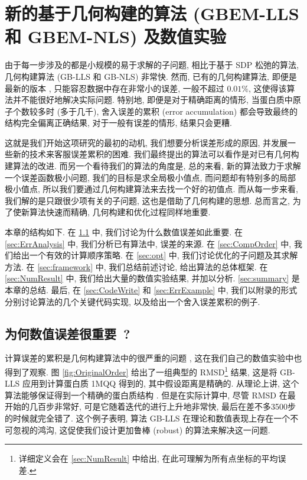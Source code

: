 \chapter{新的基于几何构建的算法 (GBEM-LLS 和 GBEM-NLS) 及数值实验}
\label{cha:ouralg}

由于每一步涉及的都是小规模的易于求解的子问题, 相比于基于 SDP 松弛的算法, 
几何构建算法 (GB-LLS 和 GB-NLS) 非常快. 
然而, 已有的几何构建算法, 即便是最新的版本 \cite{Sit2009},
只能容忍数据中存在非常小的误差, 一般不超过 $0.01\%$, 
这使得该算法并不能很好地解决实际问题.
特别地, 即便是对于精确距离的情形, 当蛋白质中原子个数较多时 (多于几千),
舍入误差的累积 (error accumulation) 都会导致最终的结构完全偏离正确结果,
对于一般有误差的情形, 结果只会更糟.

这就是我们开始这项研究的最初的动机, 我们想要分析误差形成的原因,
并发展一些新的技术来客服误差累积的困难.
我们最终提出的算法可以看作是对已有几何构建算法的改进.
而另一个看待我们的算法的角度是, 
总的来看, 新的算法致力于求解一个误差函数极小问题, 我们的目标是求全局极小值点,
而问题却有特别多的局部极小值点, 所以我们要通过几何构建算法来去找一个好的初值点.
而从每一步来看, 我们解的是只跟很少项有关的子问题,
这也是借助了几何构建的思想.
总而言之, 为了使新算法快速而精确, 几何构建和优化过程同样地重要.

本章的结构如下. 
在 \ref{sec:ErrImportant} 中, 我们讨论为什么数值误差如此重要.
在 \ref{sec:ErrAnalysis} 中, 我们分析已有算法中, 误差的来源.
在 \ref{sec:CompOrder} 中, 我们给出一个有效的计算顺序策略.
在 \ref{sec:opt} 中, 我们讨论优化的子问题及其求解方法.
在 \ref{sec:framework} 中, 我们总结前述讨论, 给出算法的总体框架.
在 \ref{sec:NumResult} 中, 我们给出大量的数值实验结果, 并加以分析.
\ref{sec:summary} 是本章的总结.
最后, 在 \ref{sec:CodeWrite} 和 \ref{sec:ErrExample} 中, 
我们以附录的形式分别讨论算法的几个关键代码实现, 以及给出一个舍入误差累积的例子.

\section{为何数值误差很重要~?}
\label{sec:ErrImportant}

计算误差的累积是几何构建算法中的很严重的问题 \cite{Wu2006,Wu2008}, 
这在我们自己的数值实验中也得到了观察.
图 \ref{fig:OriginalOrder} 给出了一组典型的 RMSD\footnote{详细定义会在 \ref{sec:NumResult} 中给出, 在此可理解为所有点坐标的平均误差.} 结果,
这是将 GB-LLS 应用到计算蛋白质 1MQQ 得到的, 其中假设距离是精确的.
从理论上讲, 这个算法能够保证得到一个精确的蛋白质结构 \cite{Sit2009}. 
但是在实际计算中, 尽管 RMSD 在最开始的几百步非常好, 
可是它随着迭代的进行上升地非常快,
最后在差不多3500步的时候就完全错了.
这个例子表明, 算法 GB-LLS 在理论和数值表现上存在一个不可忽视的鸿沟,
这促使我们设计更加鲁棒 (robust) 的算法来解决这一问题.

